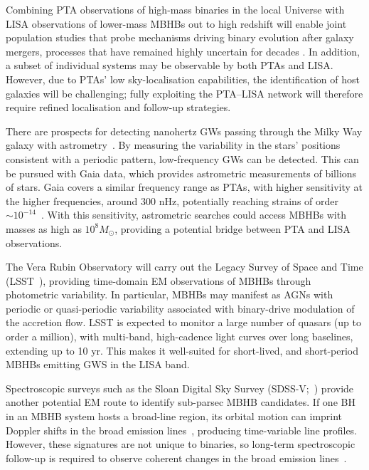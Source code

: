 \documentclass[a4paper,12pt]{article}
\begin{document}
Combining PTA observations of high-mass binaries in the local Universe with LISA observations of lower-mass MBHBs out to high redshift will enable joint population studies that probe mechanisms driving binary evolution after galaxy mergers, processes that have remained highly uncertain for decades \cite{begelman1980massive}. In addition, a subset of individual systems may be observable by both PTAs and LISA. However, due to PTAs' low sky-localisation capabilities, the identification of host galaxies will be challenging; fully exploiting the PTA--LISA network will therefore require refined localisation and follow-up strategies.

There are prospects for detecting nanohertz GWs passing through the Milky Way galaxy with astrometry~\cite{moore2017astrometric}. By measuring the variability in the stars' positions consistent with a periodic pattern, low-frequency GWs can be detected.
This can be pursued with Gaia data, which provides astrometric measurements of billions of stars. Gaia covers a similar frequency range as PTAs, with higher sensitivity at the higher frequencies, around 300 nHz, potentially reaching strains of order $\sim10^{-14}$~\cite{moore2017astrometric}. With this sensitivity, astrometric searches could access MBHBs with masses as high as $10^{8} M_\odot$, providing a potential bridge between PTA and LISA observations. 

The Vera Rubin Observatory will carry out the Legacy Survey of Space and Time (LSST~\cite{ivezic2019lsst}), providing time-domain EM observations of MBHBs through photometric variability. In particular, MBHBs may manifest as AGNs with periodic or quasi-periodic variability associated with binary-drive modulation of the accretion flow. LSST is expected to monitor a large number of quasars (up to order a million), with multi-band, high-cadence light curves over long baselines, extending up to 10 yr. This makes it well-suited for short-lived, and short-period MBHBs emitting GWS in the LISA band.

Spectroscopic surveys such as the Sloan Digital Sky Survey (SDSS-V;~\cite{kollmeier2026sloan}) provide another potential EM route to identify sub-parsec MBHB candidates. If one BH in an MBHB system hosts a broad-line region, its orbital motion can imprint Doppler shifts in the broad emission lines~\cite{nguyen2020emission}, producing time-variable line profiles. However, these signatures are not unique to binaries, so long-term spectroscopic follow-up is required to observe coherent changes in the broad emission lines~\cite{runnoe2017large}.
\end{document}
